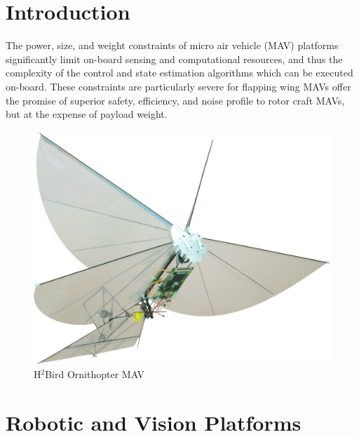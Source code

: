 \documentclass{aamas2013}
\begin{document}



\section{Introduction}
The power, size, and weight constraints of micro air vehicle (MAV) 
platforms significantly limit on-board sensing and computational 
resources, and thus the complexity of the control and state estimation 
algorithms which can be executed on-board. These constraints are 
particularly severe for flapping wing MAVs offer the promise of superior 
safety, efficiency, and noise profile to rotor craft MAVs, but at the 
expense of payload weight.

\begin{figure}[!tb]
\centering
\includegraphics[width=\linewidth]{figures/h2bird.png}
\caption{H$^2$Bird Ornithopter MAV}
\label{fig:h2bird}
\end{figure}

\section{Robotic and Vision Platforms}
\end{document}
